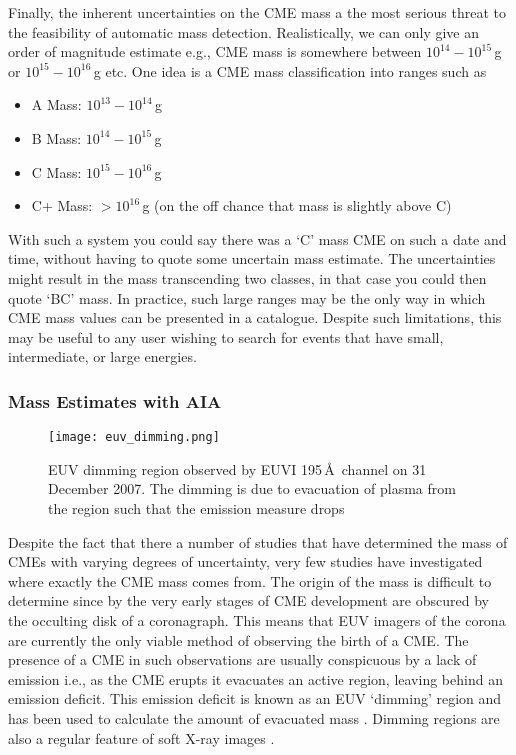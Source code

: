 Finally, the inherent uncertainties on the CME mass a the most serious threat to the feasibility of automatic mass detection. Realistically, we can only give an order of magnitude estimate e.g., CME mass is somewhere between $10^{14}-10^{15}$\,g or $10^{15}-10^{16}$\,g etc. One idea is a CME mass classification into ranges such as
\begin{itemize}
\item A Mass: $10^{13}-10^{14}$\,g
\item B Mass: $10^{14}-10^{15}$\,g
\item C Mass: $10^{15}-10^{16}$\,g
\item C+ Mass: $>10^{16}$\,g (on the off chance that mass is slightly above C)
\end{itemize}
With such a system you could say there was a \textquoteleft C' mass CME on such a date and time, without having to quote some uncertain mass estimate. The uncertainties might result in the mass transcending two classes, in that case you could then quote \textquoteleft BC' mass. In practice, such large ranges may be the only way in which CME mass values can be presented in a catalogue. Despite such limitations, this may be useful to any user wishing to search for events that have small, intermediate, or large energies.

\subsubsection{Mass Estimates with AIA}
\begin{figure}[t!]
\begin{center}
\texttt{[image: euv\_dimming.png]}
\caption[EUVI dimming region]{EUV dimming region observed by EUVI 195\,\AA~channel on 31 December 2007. The dimming is due to evacuation of plasma from the region such that the emission measure drops \citep{aschw09}}
\end{center}
\end{figure}
Despite the fact that there a number of studies that have determined the mass of CMEs with varying degrees of uncertainty, very few studies have investigated where exactly the CME mass comes from. The origin of the mass is difficult to determine since by the very early stages of CME development are obscured by the occulting disk of a coronagraph. This means that EUV imagers of the corona are currently the only viable method of observing the birth of a CME. The presence of a CME in such observations are usually conspicuous by a lack of emission i.e., as the CME erupts it evacuates an active region, leaving behind an emission deficit. This emission deficit is known as an EUV `dimming' region and has been used to calculate the amount of evacuated mass \citep{aschw09}. Dimming regions are also a regular feature of soft X-ray images \citep{sterling1997}.

